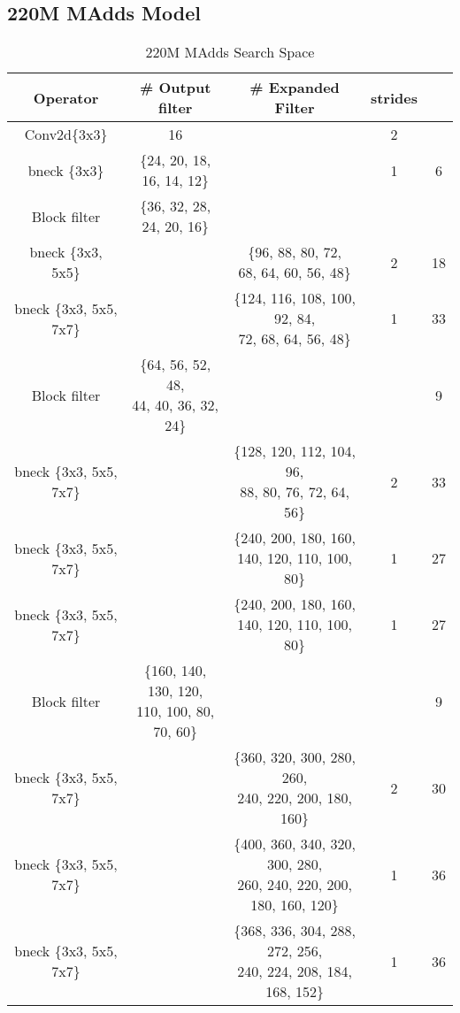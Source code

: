 \subsection{220M MAdds Model}



\begin{table}
\caption{220M MAdds Search Space} 
\begin{center}

\begin{tabular}[hp]{c|c|c|c|c}
\hline
\hline
 Operator  &\# Output filter &\# Expanded Filter &strides &\\ 
\hline
  Conv2d\{3x3\} &16 & &2 \\
\hline
  bneck \{3x3\} & \{24, 20, 18, 16, 14, 12\} & &1 &6 \\
\hline
  Block filter &\{36, 32, 28, 24, 20, 16\} & & \\
  bneck \{3x3, 5x5\} & &\shortstack{\{96, 88, 80, 72, \\ 68, 64, 60, 56, 48\}} &2 &18 \\
  bneck \{3x3, 5x5, 7x7\} & &\shortstack{\{124, 116, 108, 100, 92, 84,\\  72, 68, 64, 56, 48\}} &1 &33 \\
\hline
Block filter &\shortstack{\{64, 56, 52, 48, \\ 44, 40, 36, 32, 24\}} & & &9\\
  bneck \{3x3, 5x5, 7x7\} & &\shortstack{\{128, 120, 112, 104, 96, \\ 88, 80, 76, 72, 64, 56\}} &2 &33 \\
  bneck \{3x3, 5x5, 7x7\} & &\shortstack{\{240, 200, 180, 160, \\ 140, 120, 110, 100, 80\}} &1  &27\\
  bneck \{3x3, 5x5, 7x7\} & &\shortstack{\{240, 200, 180, 160, \\ 140, 120, 110, 100, 80\}} &1 &27 \\
\hline
Block filter &\shortstack{\{160, 140, 130, 120, \\ 110, 100, 80, 70, 60\}} & & &9 \\
  bneck \{3x3, 5x5, 7x7\} & &\shortstack{\{360, 320, 300, 280, 260, \\ 240, 220, 200, 180, 160\}} &2  &30\\
  bneck \{3x3, 5x5, 7x7\} & &\shortstack{\{400, 360, 340, 320, 300, 280, \\ 260, 240, 220, 200, 180, 160, 120\}} &1 &36 \\
  bneck \{3x3, 5x5, 7x7\} & &\shortstack{\{368, 336, 304, 288, 272, 256, \\ 240, 224, 208, 184, 168, 152\}} &1 &36 \\

\end{tabular}
\end{center}
\end{table}
